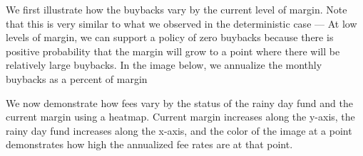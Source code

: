 We first illustrate how the buybacks vary by the current level of margin. Note that this is very
similar to what we observed in the deterministic case --- At low levels of margin, we can support
a policy of zero buybacks because there is positive probability that the margin will grow to a point
where there will be relatively large buybacks. In the image below, we annualize the monthly buybacks
as a percent of margin

\begin{center}
  \begin{figure}[H]
    \label{fig:sm_buybacks}
  \end{figure}
\end{center}

We now demonstrate how fees vary by the status of the rainy day fund and the current margin using
a heatmap. Current margin increases along the y-axis, the rainy day fund increases along the x-axis,
and the color of the image at a point demonstrates how high the annualized fee rates are at that
point.

\begin{center}
  \begin{figure}[H]
    \label{fig:sm_annualized_taxrates}
  \end{figure}
\end{center}

